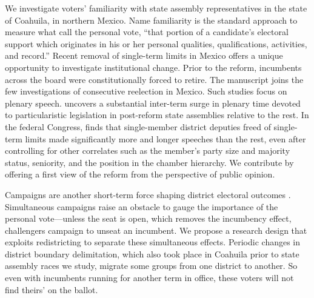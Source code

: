 \documentclass[letter,12pt]{article}
\begin{document}
We investigate voters' familiarity with state assembly representatives in the state of Coahuila, in northern Mexico. Name familiarity is the standard approach to measure what \citet[][:9]{cain.etal.1987} call the personal vote, ``that portion of a candidate's electoral support which originates in his or her personal qualities, qualifications, activities, and record.'' Recent removal of single-term limits in Mexico \citep[see][]{magarInstReel.2017} offers a unique opportunity to investigate institutional change. Prior to the reform, incumbents across the board were constitutionally forced to retire. The manuscript joins the few investigations of consecutive reelection in Mexico. Such studies focus on plenary speech. \citet{motolinia-reel-pork2021} uncovers a substantial inter-term surge in plenary time devoted to particularistic legislation in post-reform state assemblies relative to the rest. In the federal Congress, \citet{magar.debate.2021} finds that single-member district deputies freed of single-term limits made significantly more and longer speeches than the rest, even after controlling for other correlates such as the member's party size and majority status, seniority, and the position in the chamber hierarchy. We contribute by offering a first view of the reform from the perspective of public opinion.

Campaigns are another short-term force shaping district electoral outcomes \citep{moreno.decisElec.2009,downs.1957,jacobson.1990spending,popkin.1991}. Simultaneous campaigns raise an obstacle to gauge the importance of the personal vote---unless the seat is open, which removes the incumbency effect, challengers campaign to unseat an incumbent. We propose a research design that exploits redistricting to separate these simultaneous effects. Periodic changes in district boundary delimitation, which also took place in Coahuila prior to state assembly races we study, migrate some groups from one district to another. So even with incumbents running for another term in office, these voters will not find theirs' on the ballot. 

\end{document}
